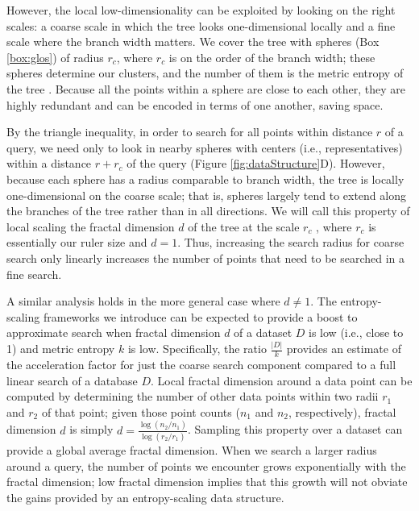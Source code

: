 \documentclass[review,preprint,12pt]{elsarticle}
\renewcommand{\cite}{\citep} %
\theoremstyle{definition}
\theoremstyle{remark}
\numberwithin{equation}{section}
\begin{document}
However, the local low-dimensionality can be exploited by looking on the right scales: a coarse scale in which the tree looks one-dimensional locally and a fine scale where the branch width matters.
We cover the tree with spheres (Box \ref{box:glos}) of radius $r_c$, where $r_c$ is on the order of the branch width; these spheres determine our clusters, and the number of them is the metric entropy of the tree \cite{tao2008product}.
Because all the points within a sphere are close to each other, they are highly 
redundant and can be encoded in terms of one another, saving space.

By the triangle inequality, in order to search for all points within distance $r$ of a query, we need only to look in nearby spheres with centers (i.e., representatives) within a distance $r+r_c$ of the query (Figure \ref{fig:dataStructure}D).
However, because each sphere has a radius comparable to branch width, the tree is locally one-dimensional on the coarse scale; that is, spheres largely tend to extend along the branches of the tree rather than in all directions.
We will call this property of local scaling the fractal dimension $d$ of the tree at the scale $r_c$ \cite{falconer1990fractal}, where $r_c$ is essentially our ruler size and $d=1$.
Thus, increasing the search radius for coarse search only linearly increases the number of points that need to be searched in a fine search.

A similar analysis holds in the more general case where $d \ne 1$.
The entropy-scaling frameworks we introduce can be expected to provide a boost to 
approximate search when fractal dimension $d$ of a dataset $D$ is low (i.e., close to 1) and metric
entropy $k$ is low.
Specifically, the ratio $\frac{|D|}{k}$ provides an estimate of the acceleration factor
for just the coarse search component compared to a full linear search of a database $D$.
Local fractal dimension around a data point can be computed by determining the
number of other data points within two radii $r_1$ and $r_2$ of that point;
given those point counts ($n_1$ and $n_2$, respectively), fractal dimension $d$
is simply $d=\frac{\log (n_2 / n_1)}{ \log (r_2 / r_1)}$.
Sampling this property over a dataset can provide a global average fractal 
dimension.
When we search a larger radius around a query, the number of points we encounter grows exponentially with the fractal dimension;
low fractal dimension implies that this growth will not obviate the gains provided by an entropy-scaling data structure.
\end{document}
